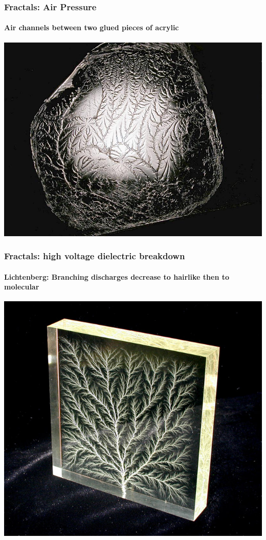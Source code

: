 \documentclass[10pt]{beamer}
\begin{document}
\begin{frame}
\frametitle{Fractals: Air Pressure}
\framesubtitle{Air channels between two glued pieces of acrylic}
\begin{center}
\includegraphics[height=0.9\textheight]{figs/fractal1}
\end{center}
\end{frame}
\begin{frame}
\frametitle{Fractals: high voltage dielectric breakdown}
\framesubtitle{Lichtenberg: Branching discharges decrease to hairlike then to
molecular}
\begin{center}
\includegraphics[height=0.9\textheight]{figs/fractal2}
\end{center}
\end{frame}
\end{document}
